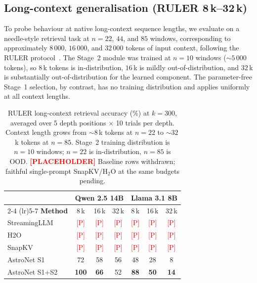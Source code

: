\subsection{Long-context generalisation (RULER 8\,k--32\,k)}\label{sec:ruler}

To probe behaviour at native long-context sequence lengths, we evaluate on a needle-style retrieval task at $n=22$, $44$, and $85$ windows, corresponding to approximately $8\,000$, $16\,000$, and $32\,000$ tokens of input context, following the RULER protocol~\cite{hsieh2024ruler}. The Stage~2 module was trained at $n=10$ windows ($\sim 5\,000$ tokens), so $8\,$k tokens is in-distribution, $16\,$k is mildly out-of-distribution, and $32\,$k is substantially out-of-distribution for the learned component. The parameter-free Stage~1 selection, by contrast, has no training distribution and applies uniformly at all context lengths.

\begin{table}[t]
\caption{RULER long-context retrieval accuracy (\%) at $k{=}300$, averaged over 5 depth positions $\times$ 10 trials per depth. Context length grows from $\sim8$\,k tokens at $n=22$ to $\sim32$\,k tokens at $n=85$. Stage~2 training distribution is $n=10$ windows; $n=22$ is in-distribution, $n=85$ is OOD. \textcolor{red}{\textbf{[PLACEHOLDER]}} Baseline rows withdrawn; faithful single-prompt SnapKV/H$_2$O at the same budgets pending.}
\label{tab:ruler}
\centering
\small
\setlength{\tabcolsep}{6pt}
\begin{tabular}{l c c c c c c}
\toprule
& \multicolumn{3}{c}{\textbf{Qwen 2.5 14B}} & \multicolumn{3}{c}{\textbf{Llama 3.1 8B}} \\
\cmidrule(lr){2-4} \cmidrule(lr){5-7}
\textbf{Method} & 8\,k & 16\,k & 32\,k & 8\,k & 16\,k & 32\,k \\
\midrule
StreamingLLM    & \textcolor{red}{[P]} & \textcolor{red}{[P]} & \textcolor{red}{[P]} & \textcolor{red}{[P]} & \textcolor{red}{[P]} & \textcolor{red}{[P]} \\
H2O             & \textcolor{red}{[P]} & \textcolor{red}{[P]} & \textcolor{red}{[P]} & \textcolor{red}{[P]} & \textcolor{red}{[P]} & \textcolor{red}{[P]} \\
SnapKV          & \textcolor{red}{[P]} & \textcolor{red}{[P]} & \textcolor{red}{[P]} & \textcolor{red}{[P]} & \textcolor{red}{[P]} & \textcolor{red}{[P]} \\
AstroNet S1     & 72 & 58 & 56 & 48 & 28 &  8 \\
AstroNet S1+S2  & \textbf{100} & \textbf{66} & 52 & \textbf{88} & \textbf{50} & \textbf{14} \\
\bottomrule
\end{tabular}
\end{table}

